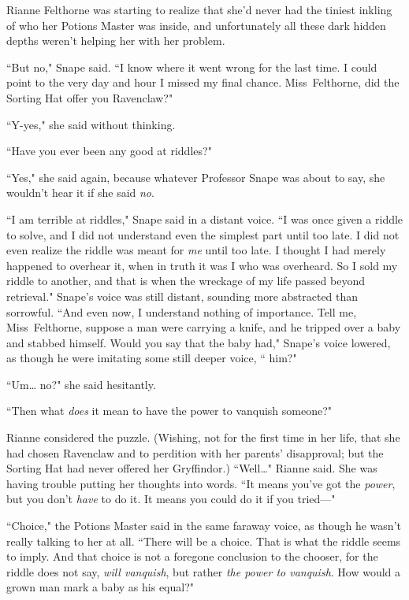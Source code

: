 Rianne Felthorne was starting to realize that she'd never had the tiniest inkling of who her Potions Master was inside, and unfortunately all these dark hidden depths weren't helping her with her problem.

``But no," Snape said. ``I know where it went wrong for the last time. I could point to the very day and hour I missed my final chance. Miss~Felthorne, did the Sorting Hat offer you Ravenclaw?"

``Y-yes," she said without thinking.

``Have you ever been any good at riddles?"

``Yes," she said again, because whatever Professor Snape was about to say, she wouldn't hear it if she said \emph{no}.

``I am terrible at riddles," Snape said in a distant voice. ``I was once given a riddle to solve, and I did not understand even the simplest part until too late. I did not even realize the riddle was meant for \emph{me} until too late. I thought I had merely happened to overhear it, when in truth it was I who was overheard. So I sold my riddle to another, and that is when the wreckage of my life passed beyond retrieval." Snape's voice was still distant, sounding more abstracted than sorrowful. ``And even now, I understand nothing of importance. Tell me, Miss~Felthorne, suppose a man were carrying a knife, and he tripped over a baby and stabbed himself. Would you say that the baby had," Snape's voice lowered, as though he were imitating some still deeper voice, `` him?"

``Um{\ldots} no?" she said hesitantly.

``Then what \emph{does} it mean to have the power to vanquish someone?"

Rianne considered the puzzle. (Wishing, not for the first time in her life, that she had chosen Ravenclaw and to perdition with her parents' disapproval; but the Sorting Hat had never offered her Gryffindor.) ``Well{\ldots}" Rianne said. She was having trouble putting her thoughts into words. ``It means you've got the \emph{power}, but you don't \emph{have} to do it. It means you could do it if you tried—"

``Choice," the Potions Master said in the same faraway voice, as though he wasn't really talking to her at all. ``There will be a choice. That is what the riddle seems to imply. And that choice is not a foregone conclusion to the chooser, for the riddle does not say, \emph{will vanquish}, but rather \emph{the power to vanquish}. How would a grown man mark a baby as his equal?"

